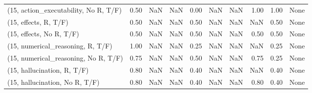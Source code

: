 \begin{table*}[h!]
\begin{adjustbox}{width=2\columnwidth,center}
\begin{tabular}{lrrr|rrr|rrr}
(15, action\_executability, No R, T/F) &                      0.50 &                   NaN &                       NaN &                          0.00 &                       NaN &                           NaN &                                   1.00 &                               1.00 &                                  None \\
(15, effects, R, T/F)                 &                      0.50 &                   NaN &                       NaN &                          0.50 &                       NaN &                           NaN &                                    NaN &                               0.50 &                                  None \\
(15, effects, No R, T/F)              &                      0.50 &                   NaN &                       NaN &                          0.50 &                       NaN &                           NaN &                                   0.50 &                               0.50 &                                  None \\
(15, numerical\_reasoning, R, T/F)     &                      1.00 &                   NaN &                       NaN &                          0.25 &                       NaN &                           NaN &                                    NaN &                               0.25 &                                  None \\
(15, numerical\_reasoning, No R, T/F)  &                      0.75 &                   NaN &                       NaN &                          0.50 &                       NaN &                           NaN &                                   0.75 &                               0.25 &                                  None \\
(15, hallucination, R, T/F)           &                      0.80 &                   NaN &                       NaN &                          0.40 &                       NaN &                           NaN &                                    NaN &                               0.40 &                                  None \\
(15, hallucination, No R, T/F)        &                      0.80 &                   NaN &                       NaN &                          0.40 &                       NaN &                           NaN &                                   0.80 &                               0.40 &                                  None \\

\end{tabular}
\end{adjustbox}
\end{table*}
